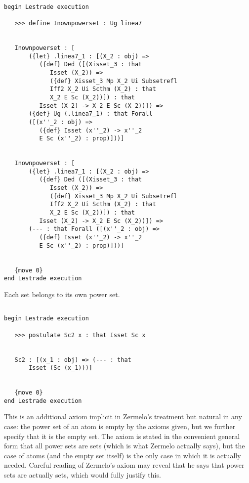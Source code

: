 \documentclass[12pt]{article}
\begin{document}
\begin{verbatim}

begin Lestrade execution

   >>> define Inownpowerset : Ug linea7


   Inownpowerset : [
       ({let} .linea7_1 : [(X_2 : obj) => 
          ({def} Ded ([(Xisset_3 : that 
             Isset (X_2)) => 
             ({def} Xisset_3 Mp X_2 Ui Subsetrefl 
             Iff2 X_2 Ui Scthm (X_2) : that 
             X_2 E Sc (X_2))]) : that 
          Isset (X_2) -> X_2 E Sc (X_2))]) => 
       ({def} Ug (.linea7_1) : that Forall 
       ([(x''_2 : obj) => 
          ({def} Isset (x''_2) -> x''_2 
          E Sc (x''_2) : prop)]))]


   Inownpowerset : [
       ({let} .linea7_1 : [(X_2 : obj) => 
          ({def} Ded ([(Xisset_3 : that 
             Isset (X_2)) => 
             ({def} Xisset_3 Mp X_2 Ui Subsetrefl 
             Iff2 X_2 Ui Scthm (X_2) : that 
             X_2 E Sc (X_2))]) : that 
          Isset (X_2) -> X_2 E Sc (X_2))]) => 
       (--- : that Forall ([(x''_2 : obj) => 
          ({def} Isset (x''_2) -> x''_2 
          E Sc (x''_2) : prop)]))]


   {move 0}
end Lestrade execution
\end{verbatim}

Each set belongs to its own power set.

\begin{verbatim}

begin Lestrade execution

   >>> postulate Sc2 x : that Isset Sc x


   Sc2 : [(x_1 : obj) => (--- : that 
       Isset (Sc (x_1)))]


   {move 0}
end Lestrade execution
\end{verbatim}

This is an additional axiom implicit in Zermelo's treatment but natural in any case:  the power set of an atom is empty by the axioms given, but we further
specify that it is the empty set.  The axiom is stated in the convenient general form that all power sets are sets (which is what Zermelo actually says), but the case of atoms (and the empty set itself)
is the only case in which it is actually needed.  Careful reading of Zermelo's axiom may reveal that he says that power sets are actually sets, which would fully justify this.
\end{document}
